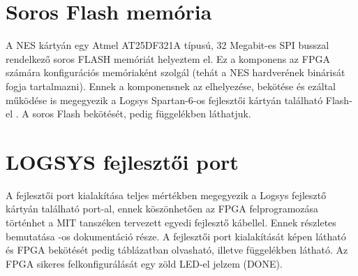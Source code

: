 \section{Soros Flash memória}
	
	A NES kártyán egy Atmel AT25DF321A típusú, 32 Megabit-es SPI busszal rendelkező soros FLASH memóriát helyeztem el. Ez a komponens az FPGA számára konfigurációs memóriaként szolgál (tehát a NES hardverének binárisát fogja tartalmazni). Ennek a komponensnek az elhelyezése, bekötése és ezáltal működése is megegyezik a Logsys Spartan-6-os fejlesztői kártyán található Flash-el \cite{spatan6}. A soros Flash bekötését, pedig  függelékben láthatjuk.
	
\section{LOGSYS fejlesztői port}
\label{sec:logsysport}
	
	A fejlesztői port kialakítása teljes mértékben megegyezik a Logsys fejlesztő kártyán található port-al, ennek köszönhetően az FPGA felprogramozása történhet a MIT tanszéken tervezett egyedi fejlesztő kábellel. Ennek részletes bemutatása -os dokumentáció része. A fejlesztői port kialakítását  képen látható és FPGA bekötését pedig  táblázatban olvasható, illetve  függelékben látható. Az FPGA sikeres felkonfigurálását egy zöld LED-el jelzem (DONE). %
	
